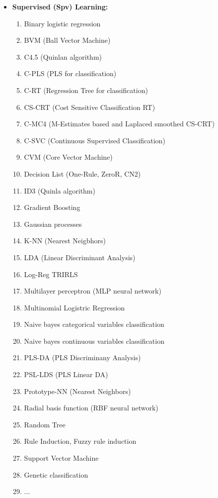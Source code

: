 \begin{itemize}
		\item \textbf{Supervised (Spv) Learning:}
		\begin{multicols}{2}
		\begin{enumerate}
			\item Binary logistic regression
			\item BVM (Ball Vector Machine)
			\item C4.5 (Quinlan algorithm)
			\item C-PLS (PLS for classification)
			\item C-RT (Regression Tree for classification)
			\item CS-CRT (Cost Sensitive Classification RT)
			\item C-MC4 (M-Estimates based and Laplaced smoothed CS-CRT)
			\item C-SVC (Continuous Supervised Classification)
			\item CVM (Core Vector Machine)
			\item Decision List (One-Rule, ZeroR, CN2)
			\item ID3 (Quinla algorithm)
			\item Gradient Boosting
			\item Gaussian processes
			\item K-NN (Nearest Neigbhors)
			\item LDA (Linear Discriminant Analysis)
			\item Log-Reg TRIRLS 
			\item Multilayer perceptron (MLP neural network)
			\item Multinomial Logistric Regression
			\item Naive bayes categorical variables classification
			\item Naive bayes continuous variables classification
			\item PLS-DA (PLS Discriminany Analysis)
			\item PSL-LDS (PLS Linear DA)
			\item Prototype-NN (Nearest Neighbors)
			\item Radial basis function (RBF neural network)
			\item Random Tree
			\item Rule Induction, Fuzzy rule induction
			\item Support Vector Machine
			\item Genetic classification
			\item ...
		\end{enumerate}
		\end{multicols}
		

\end{itemize}
